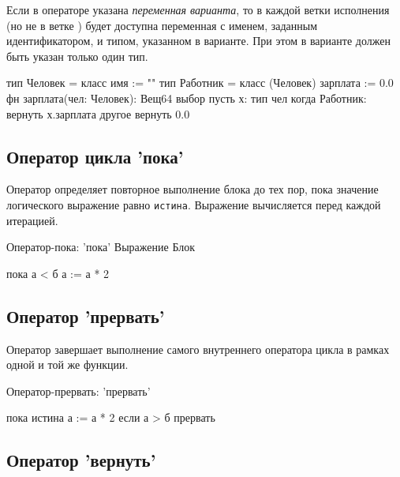 Если в операторе указана \emph{переменная варианта}, то в каждой ветки исполнения 
(но не в ветке ) будет доступна переменная с именем, заданным идентификатором,
 и типом, указанном в варианте. При этом в варианте должен быть указан только один тип.
 
\begin{Trivil}
тип Человек = класс { имя := "" }
тип Работник = класс (Человек) {
    зарплата := 0.0
}
фн зарплата(чел: Человек): Вещ64 {
    выбор пусть х: тип чел { 
    когда Работник: вернуть х.зарплата
    другое вернуть 0.0
    }
}
\end{Trivil}

\hypertarget{while-stmt}{%
\subsection{Оператор цикла 'пока' }\label{stmt:while-stmt}}

Оператор  определяет повторное выполнение блока до тех пор, пока значение логического выражение равно \verb+истина+. 
Выражение вычисляется перед каждой итерацией.

\begin{Grammar}
Оператор-пока: 'пока' Выражение Блок 
\end{Grammar}

\begin{Trivil}
пока а < б {
    а := а * 2
}
\end{Trivil}

\hypertarget{break-stmt}{%
\subsection{Оператор 'прервать'}\label{stmt:break-stmt}}

Оператор  завершает выполнение самого внутреннего оператора цикла в рамках одной и той же функции.

\begin{Grammar}
Оператор-прервать: 'прервать' 
\end{Grammar}

\begin{Trivil}
пока истина {
    а := а * 2
    если а > б { прервать }
}
\end{Trivil}

\hypertarget{return-stmt}{%
\subsection{Оператор 'вернуть'}\label{stmt:return-stmt}}

